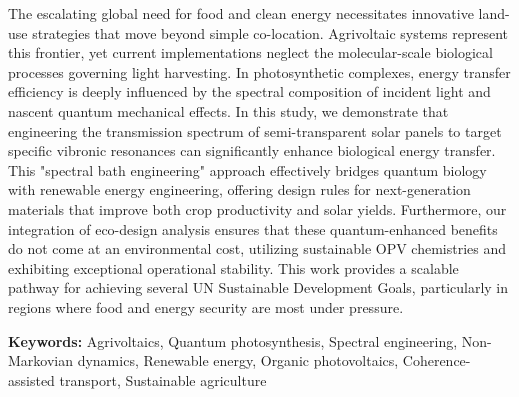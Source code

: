 \documentclass[11pt,a4paper]{article}
\begin{document}
The escalating global need for food and clean energy necessitates innovative land-use strategies that move beyond simple co-location. Agrivoltaic systems represent this frontier, yet current implementations neglect the molecular-scale biological processes governing light harvesting. In photosynthetic complexes, energy transfer efficiency is deeply influenced by the spectral composition of incident light and nascent quantum mechanical effects. In this study, we demonstrate that engineering the transmission spectrum of semi-transparent solar panels to target specific vibronic resonances can significantly enhance biological energy transfer. This "spectral bath engineering" approach effectively bridges quantum biology with renewable energy engineering, offering design rules for next-generation materials that improve both crop productivity and solar yields. Furthermore, our integration of eco-design analysis ensures that these quantum-enhanced benefits do not come at an environmental cost, utilizing sustainable OPV chemistries and exhibiting exceptional operational stability. This work provides a scalable pathway for achieving several UN Sustainable Development Goals, particularly in regions where food and energy security are most under pressure.

\vspace{1em}


\noindent\textbf{Keywords:} Agrivoltaics, Quantum photosynthesis, Spectral engineering, Non-Markovian dynamics, Renewable energy, Organic photovoltaics, Coherence-assisted transport, Sustainable agriculture












\end{document}
